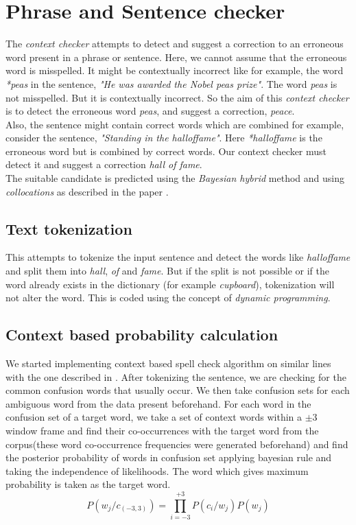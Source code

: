 \documentclass{article}
\begin{document}
	\section{Phrase and Sentence checker}
		The \textit{context checker} attempts to detect and suggest a correction to an erroneous word present in a phrase or sentence. Here, we cannot assume that the erroneous word is misspelled. It might be contextually incorrect like for example, the word \textit{*peas} in the sentence, \textit{"He was awarded the Nobel peas prize"}. The word \textit{peas} is not misspelled. But it is contextually incorrect. So the aim of this \textit{context checker} is to detect the erroneous word \textit{peas}, and suggest a correction, \textit{peace}.\\
		Also, the sentence might contain correct words which are combined for example, consider the sentence, \textit{"Standing in the halloffame"}. Here \textit{*halloffame} is the erroneous word but is combined by correct words. Our context checker must detect it and suggest a correction \textit{hall of fame}.\\
		The suitable candidate is predicted using the \textit{Bayesian hybrid} method and using \textit{collocations} as described in the paper \cite{bayesian_hybrid}.\\
		\subsection{Text tokenization}
			This attempts to tokenize the input sentence and detect the words like \textit{halloffame} and split them into \textit{hall}, \textit{of} and \textit{fame}. But if the split is not possible or if the word already exists in the dictionary (for example \textit{cupboard}), tokenization will not alter the word. This is coded using the concept of \textit{dynamic programming}.
		\subsection{Context based probability calculation}
			We started implementing context based spell check algorithm on similar lines with the one described in \cite{bayesian_hybrid}. After tokenizing the sentence, we are checking for the common confusion words that usually occur. We then take confusion sets for each ambiguous word from the data present beforehand. For each word in the confusion set of a target word, we take a set of context words within a $\pm3$ window frame and find their co-occurrences with the target word from the corpus(these word co-occurrence frequencies were generated beforehand) and find the posterior probability of words in confusion set applying bayesian rule and taking the independence of likelihoods. The word which gives maximum probability is taken as the target word.
			\begin{equation*}
				P(w_{j}/c_{(-3,3)})=\underset{i=-3}{\overset{+3}{\prod}}P(c_{i}/w_{j})P(w_{j})
			\end{equation*}
\end{document}
